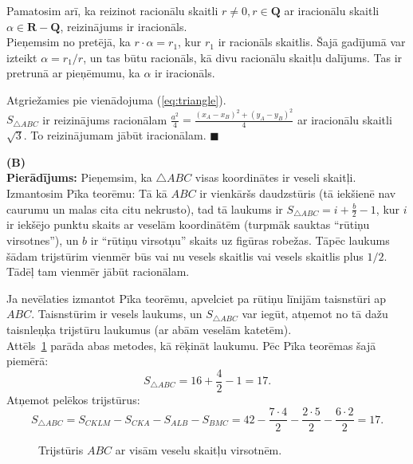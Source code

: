 \documentclass[a4paper,12pt]{article}
\newcommand\Q{\mathbf{Q}}
\newcommand\R{\mathbf{R}}
\begin{document}
\vspace{5pt}
Pamatosim arī, ka reizinot racionālu skaitli $r \neq 0, r \in \Q$ ar iracionālu skaitli $\alpha \in \R -\Q$, reizinājums ir iracionāls.\\
Pieņemsim no pretējā, ka $r \cdot \alpha = r_1$, kur $r_1$ ir racionāls skaitlis.
Šajā gadījumā var izteikt $\alpha = r_1/r$, un tas būtu racionāls, kā divu racionālu skaitļu dalījums. 
Tas ir pretrunā ar pieņēmumu, ka $\alpha$ ir iracionāls.


\vspace{5pt} 
Atgriežamies pie vienādojuma (\ref{eq:triangle}).\\
$S_{\bigtriangleup{}ABC}$ ir reizinājums
racionālam $\frac{a^2}{4} = \frac{(x_A - x_B)^2 + (y_A - y_B)^2}{4}$ ar iracionālu skaitli $\sqrt{3}$. 
To reizinājumam jābūt iracionālam. $\blacksquare$



\vspace{10pt}
{\bf (B)}\\
{\bf Pierādījums:} Pieņemsim, ka $\bigtriangleup{}ABC$ visas koordinātes ir veseli skaitļi. 
Izmantosim Pīka teorēmu: Tā kā $ABC$ ir vienkāršs daudzstūris (tā iekšienē nav caurumu un malas 
cita citu nekrusto), tad tā laukums ir $S_{\bigtriangleup{}ABC} = i + \frac{b}{2} - 1$, kur $i$ ir iekšējo punktu skaits ar veselām koordinātēm (turpmāk 
sauktas ``rūtiņu virsotnes''), un
$b$ ir ``rūtiņu virsotņu'' skaits uz figūras robežas. 
Tāpēc laukums šādam trijstūrim vienmēr būs vai nu vesels skaitlis vai vesels skaitlis plus $1/2$. 
Tādēļ tam vienmēr jābūt racionālam. 

Ja nevēlaties izmantot Pīka teorēmu, apvelciet pa rūtiņu līnijām taisnstūri ap $ABC$. 
Taisnstūrim ir vesels laukums, un $S_{\bigtriangleup{}ABC}$ var iegūt, atņemot no tā dažu taisnleņķa
trijstūru laukumus (ar abām veselām katetēm).\\
Attēls~\ref{fig:grid-triangles} parāda abas metodes, kā rēķināt laukumu. Pēc Pīka teorēmas šajā piemērā:
$$S_{\bigtriangleup{}ABC} = 16 + \frac{4}{2} - 1 = 17.$$
Atņemot pelēkos trijstūrus:
$$S_{\bigtriangleup{}ABC} = S_{CKLM} - S_{CKA} - S_{ALB} - S_{BMC} = 42 - \frac{7 \cdot 4}{2} - \frac{2 \cdot 5}{2} - \frac{6 \cdot 2}{2} = 17.$$

\begin{figure}[!htb]
\caption{\label{fig:grid-triangles} Trijstūris $ABC$ ar visām veselu skaitļu virsotnēm.}
\end{figure}
\end{document}
